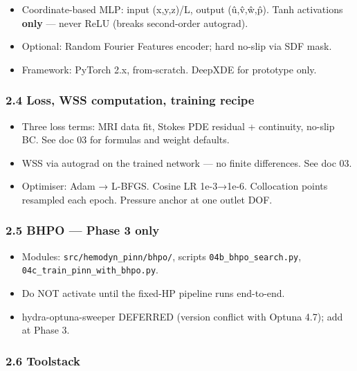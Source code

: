 \documentclass[
]{article}
\providecommand{\tightlist}{%
  \setlength{\itemsep}{0pt}\setlength{\parskip}{0pt}}
\begin{document}
\begin{itemize}
\tightlist
\item
  Coordinate-based MLP: input (x,y,z)/L, output (û,v̂,ŵ,p̂). Tanh
  activations \textbf{only} --- never ReLU (breaks second-order
  autograd).
\item
  Optional: Random Fourier Features encoder; hard no-slip via SDF mask.
\item
  Framework: PyTorch 2.x, from-scratch. DeepXDE for prototype only.
\end{itemize}

\subsubsection{2.4 Loss, WSS computation, training
recipe}\label{loss-wss-computation-training-recipe}

\begin{itemize}
\tightlist
\item
  Three loss terms: MRI data fit, Stokes PDE residual + continuity,
  no-slip BC. See doc 03 for formulas and weight defaults.
\item
  WSS via autograd on the trained network --- no finite differences. See
  doc 03.
\item
  Optimiser: Adam → L-BFGS. Cosine LR 1e-3→1e-6. Collocation points
  resampled each epoch. Pressure anchor at one outlet DOF.
\end{itemize}

\subsubsection{2.5 BHPO --- Phase 3 only}\label{bhpo-phase-3-only}

\begin{itemize}
\tightlist
\item
  Modules: \texttt{src/hemodyn\_pinn/bhpo/}, scripts
  \texttt{04b\_bhpo\_search.py},
  \texttt{04c\_train\_pinn\_with\_bhpo.py}.
\item
  Do NOT activate until the fixed-HP pipeline runs end-to-end.
\item
  hydra-optuna-sweeper DEFERRED (version conflict with Optuna 4.7); add
  at Phase 3.
\end{itemize}

\subsubsection{2.6 Toolstack}\label{toolstack}
\end{document}
